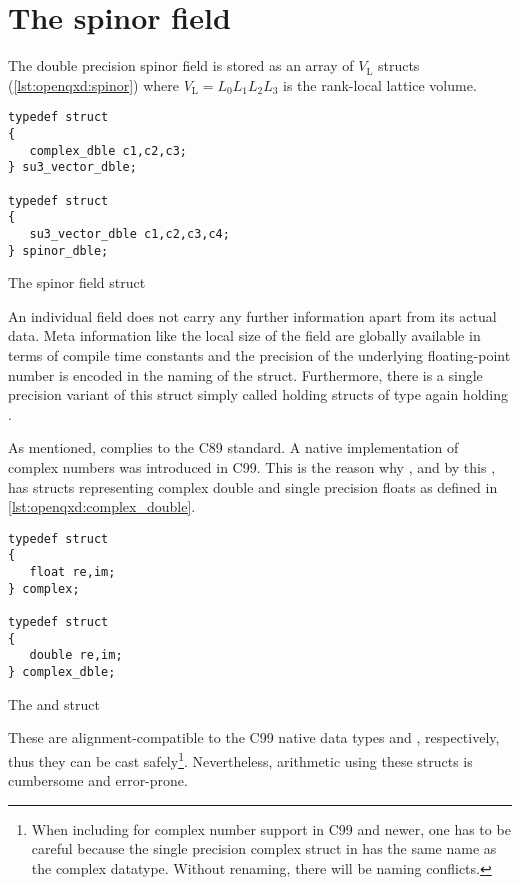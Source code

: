 \section{The spinor field}
\label{sec:openqxd:spinor:field}

The double precision spinor field is stored as an array of $V_\mathrm{L}$  structs (\cref{lst:openqxd:spinor}) where $V_\mathrm{L} = L_0 L_1 L_2 L_3$ is the rank-local lattice volume.
\begin{codelisting}
\begin{verbatim}
typedef struct
{
   complex_dble c1,c2,c3;
} su3_vector_dble;

typedef struct
{
   su3_vector_dble c1,c2,c3,c4;
} spinor_dble;
\end{verbatim}
\caption{The spinor field struct}
\label{lst:openqxd:spinor}
\end{codelisting}
An individual field does not carry any further information apart from its actual data. Meta information like the local size of the field are globally available in terms of compile time constants and the precision of the underlying floating-point number is encoded in the naming of the struct.
Furthermore, there is a single precision variant of this struct simply called  holding structs of type  again holding .

As mentioned, \openqcd complies to the C89 standard. A native implementation of complex numbers was introduced in C99. This is the reason why \openqcd, and by this \openqxd, has structs representing complex double and single precision floats as defined in \cref{lst:openqxd:complex_double}.
\begin{codelisting}
\begin{verbatim}
typedef struct
{
   float re,im;
} complex;

typedef struct
{
   double re,im;
} complex_dble;
\end{verbatim}
\caption{The  and  struct}
\label{lst:openqxd:complex_double}
\end{codelisting}
These are alignment-compatible to the C99 native data types  and , respectively, thus they can be cast safely\footnote{When including  for complex number support in C99 and newer, one has to be careful because the single precision complex struct in \openqxd has the same name as the complex datatype. Without renaming, there will be naming conflicts.}.
Nevertheless, arithmetic using these structs is cumbersome and error-prone. 

